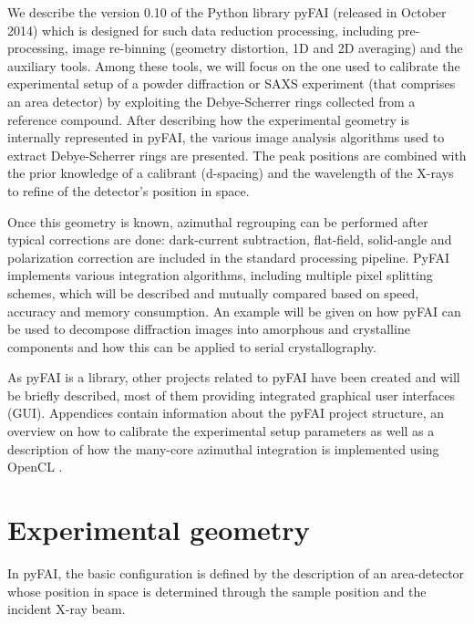 \documentclass{iucr}
\begin{document}
We describe the version 0.10 of the Python library pyFAI 
(released in October 2014) which is designed for such data reduction processing,
including pre-processing, image re-binning (geometry distortion, 1D and 2D
averaging) and the auxiliary tools\cite{pyfai}. 
Among these tools, we will focus on the one used to
calibrate the experimental setup of a powder diffraction  
or SAXS experiment (that comprises
an area detector) by exploiting the Debye-Scherrer rings collected from a
reference compound.
After describing how the experimental geometry is internally represented in
pyFAI, the various image analysis algorithms used to extract Debye-Scherrer
rings are presented.
The peak positions are combined with the prior knowledge of a calibrant
(d-spacing) and the wavelength of the X-rays  to refine of the detector's position in space.

Once this geometry is known, azimuthal regrouping can be performed after
typical corrections are done: dark-current subtraction, flat-field,
solid-angle and polarization correction are included in the standard processing
pipeline.
PyFAI implements various integration algorithms, including
multiple pixel splitting schemes, which will be described and mutually compared
based on speed, accuracy and memory consumption.
An example will be given on how pyFAI can be used to decompose
diffraction images into amorphous and crystalline components and how this can be
applied to serial crystallography.

As pyFAI is a library, other projects related to pyFAI have been created and
will be briefly described, most of them providing integrated
graphical user interfaces (GUI).
Appendices contain information about the pyFAI project structure, an
overview on how to calibrate the experimental setup parameters as well as
a description of how the many-core azimuthal integration is implemented using
OpenCL \cite{opencl}.

\section{Experimental geometry}

In pyFAI, the basic configuration is defined by the description of an
area-detector whose position in space is determined through the sample
position and the incident X-ray beam.
\end{document}
